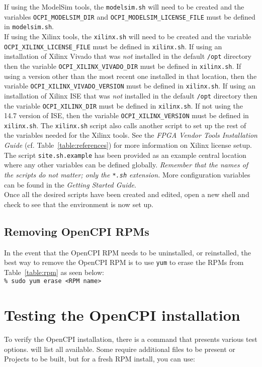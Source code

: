 If using the ModelSim tools, the \verb+modelsim.sh+ will need to be created and the variables \verb+OCPI_MODELSIM_DIR+ and \verb+OCPI_MODELSIM_LICENSE_FILE+ must be defined in \verb+modelsim.sh+.\\

If using the Xilinx tools, the \verb+xilinx.sh+ will need to be created and the variable \verb+OCPI_XILINX_LICENSE_FILE+ must be defined in \verb+xilinx.sh+. If using an installation of Xilinx Vivado that was \textit{not} installed in the default \verb+/opt+ directory then the variable \verb+OCPI_XILINX_VIVADO_DIR+ must be defined in \verb+xilinx.sh+. If using a version other than the most recent one installed in that location, then the variable \verb+OCPI_XILINX_VIVADO_VERSION+ must be defined in \verb+xilinx.sh+. If using an installation of Xilinx ISE that was \textit{not} installed in the default \verb+/opt+ directory then the variable \verb+OCPI_XILINX_DIR+ must be defined in \verb+xilinx.sh+. If not using the 14.7 version of ISE, then the variable \verb+OCPI_XILINX_VERSION+ must be defined in \verb+xilinx.sh+. The \verb+xilinx.sh+ script also calls another script to set up the rest of the variables needed for the Xilinx tools. See the \textit{FPGA Vendor Tools Installation Guide} (cf. Table~\ref{table:references}) for more information on Xilinx license setup.\\

The script \verb+site.sh.example+ has been provided as an example central location where any other variables can be defined globally. \textit{Remember that the names of the scripts do not matter; only the \texttt{*.sh} extension.} More configuration variables can be found in the \textit{Getting Started Guide}.\\

Once all the desired scripts have been created and edited, open a new shell and check to see that the environment is now set up.

\subsection{Removing OpenCPI RPMs}
In the event that the OpenCPI RPM needs to be uninstalled, or reinstalled, the best way to remove the OpenCPI RPM is to use \verb+yum+ to erase the RPMs from Table~\ref{table:rpm} as seen below:\\

	\verb+% sudo yum erase <RPM name>+

\section{Testing the OpenCPI installation}
\label{sec:testing_opencpi}
To verify the OpenCPI installation, there is a command  that presents various test options.  will list all available. Some require additional files to be present or Projects to be built, but for a fresh RPM install, you can use:\\

